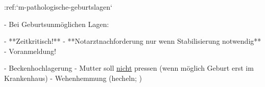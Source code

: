 :ref:`m-pathologische-geburtslagen`
\begin{itemize}
  -   Bei Geburtsunmöglichen Lagen:\begin{itemize}
    -   **Zeitkritisch!**
    -   **Notarztnachforderung nur wenn Stabilisierung
    notwendig**
    -   Voranmeldung!
  \end{itemize}
	-   Beckenhochlagerung
	-   Mutter soll \underline{nicht} pressen (wenn möglich Geburt erst im
	Krankenhaus)
	-   Wehenhemmung (hecheln; )
\end{itemize}
